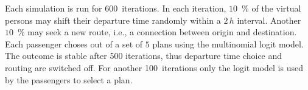 
Each simulation is run for $600$~iterations.
In each iteration, $10$~\% of the virtual persons may shift their departure time randomly within a $2 \, h$ interval.
Another $10$~\% may seek a new route, i.e., a connection between origin and destination. 
Each passenger choses out of a set of $5$ plans using the multinomial logit model. %
The outcome is stable after 500 iterations, thus departure time choice and routing are switched off. 
For another 100~iterations only the logit model is used by the passengers to select a plan. 



